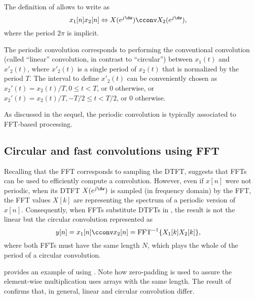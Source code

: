 The definition of  allows to write  as
\begin{equation}
x_1[n]  x_2[n] \Leftrightarrow X(e^{j \dw}) \cconv X_2(e^{j \dw}),
\label{eq:windowingConvolution2}
\end{equation}
where the period $2 \pi$ is implicit.

The periodic convolution corresponds to performing the conventional convolution (called ``linear'' convolution, in contrast to ``circular'') between $x_1(t)$ and $x'_2(t)$, where $x'_2(t)$ is a single period of $x_2(t)$ that is normalized by the period $T$.
The interval to define $x'_2(t)$ can be conveniently chosen as $x_2'(t)=x_2(t)/T, 0\le t < T$, or $0$ otherwise, or $x_2'(t)=x_2(t)/T, -T/2 \le t < T/2$, or $0$ otherwise.

As discussed in the sequel, the periodic convolution is typically associated to FFT-based processing.

\subsection{Circular and fast convolutions using FFT}
Recalling that the FFT corresponds to sampling the DTFT,  suggests that FFTs can be used to efficiently compute a convolution. 
However, even if $x[n]$ were not periodic, when its DTFT $X(e^{j \dw})$ is sampled (in frequency domain) by the FFT, the FFT values $X[k]$ are representing the spectrum of a periodic version of $x[n]$. Consequently, when FFTs substitute DTFTs in , the result is not the linear but the circular convolution represented as
\begin{equation}
y[n] = x_1[n] \cconv x_2[n] = \textrm{FFT}^{-1} \{ X_1[k] X_2[k] \},
\label{eq:circularConvolutionWithFFT}
\end{equation}
where both FFTs must have the same length $N$, which plays the whole of the period of a circular convolution.

 provides an example of using . Note how zero-padding is used to assure the element-wise  multiplication  uses arrays with the same length. The result
of  confirms that, in general, linear and
circular convolution differ.


